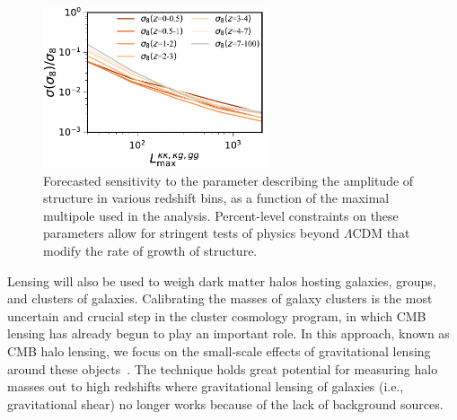 \documentclass[PICOReport.tex]{subfiles}
\begin{document}

\begin{figure}
\hspace{0.1in}
\parbox{3.3in}{
\vspace{0.15in}
\caption{\captiontext  
Forecasted sensitivity to  the parameter describing the amplitude of structure in various redshift bins, as a function of the maximal multipole used in the analysis.  Percent-level constraints on these parameters allow for stringent tests of physics beyond $\Lambda$CDM that modify the rate of growth of structure. 
\label{fig:sigma8constraint} 
} }
\hspace{0.1in}
\parbox{2.9in}{\centerline {
\includegraphics[width=2.6in]{images/PICO_s8_lmax_PICOv4.1b_deproj0_SENS0.pdf} } }
\vspace{-0.1in}
\end{figure}


Lensing will also be used to weigh dark matter halos hosting galaxies, groups, and clusters of galaxies.  Calibrating the masses of galaxy clusters is the most uncertain and crucial step in the cluster cosmology program, in which CMB lensing has already begun to play an important role.  In this approach, known as CMB halo lensing, we focus on the small-scale effects of gravitational lensing around these objects~\citep{2015ApJ...806..247B, 2015PhRvL.114o1302M, 2016A&A...594A..24P}. The technique holds great potential for measuring halo masses out to high redshifts where gravitational lensing of galaxies (i.e., gravitational shear) no longer works because of the lack of background sources.
\end{document}
